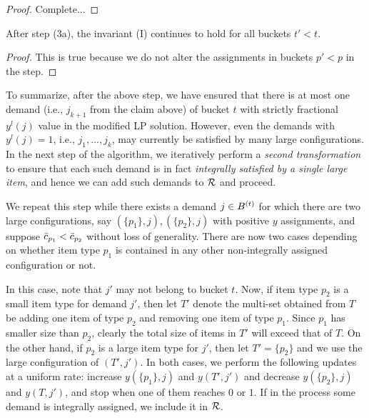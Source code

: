  \begin{proof}
 Complete...
 \end{proof}

\begin{claim}
After step (3a), the invariant (I) continues to hold for all buckets $t' < t$.
\end{claim}

\begin{proof}
This is true because we do not alter the assignments in buckets $p' < p$ in the step.
\end{proof}


To summarize, after the above step, we have ensured that there is at most one demand (i.e., $j_{k+1}$ from the claim above) of bucket $t$
with strictly fractional $y^l(j)$ value in the modified LP solution. However, even the demands with $y^l(j) = 1$, i.e.,  $j_1, \ldots, j_k$,  may currently be satisfied by many large configurations. In the next step of the algorithm, we iteratively perform a \emph{second transformation} to ensure that each such demand is in fact \emph{integrally satisfied by a single large item}, and hence we can add such demands to ${\cal R}$ and proceed.



\medskip {}
We repeat this step while there  exists a  demand $j \in B^{(t)}$ for which there are two large configurations, say $(\{p_1\}, j), (\{p_2\}, j)$ with positive $y$ assignments, and suppose ${\bar c}_{p_1} < {\bar c}_{p_2}$ without loss of generality. There are now two cases depending on whether item type $p_1$ is contained in any other non-integrally assigned configuration or not.

\medskip {}
In this case, note that $j'$ may not belong to bucket $t$. Now, if item type $p_2$ is a small item type for demand $j'$, then let $T'$ denote the multi-set obtained from $T$ be adding one item of type $p_2$ and removing one item of type $p_1$. Since $p_1$ has smaller size than $p_2$, clearly the total size of items in $T'$ will exceed that of $T$. On the other hand, if $p_2$ is a large item type for $j'$, then let $T' = \{p_2\}$ and we use the large configuration of $(T',j')$. In both cases, we perform the following updates at a uniform rate: increase $y(\{p_1\},j)$ and $y(T',j')$ and decrease $y(\{p_2\},j)$ and $y(T,j')$, and stop when one of them reaches $0$ or $1$. If in the process some demand is integrally assigned, we include it in ${\cal R}$.

